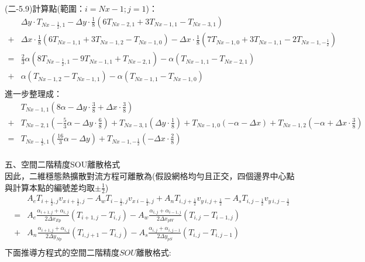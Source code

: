 \documentclass[12pt]{article}
\begin{document}
\noindent (二-5.9)計算點(範圍：$i = Nx-1 ; j = 1$)：\\
\begin{equation}
\begin{split}
  &\Delta y \cdot T_{Nx-\frac{1}{2},1}  
  - \Delta y \cdot \frac{1}{8}\left(6T_{Nx-2,1}+3T_{Nx-1,1}-T_{Nx-3,1}\right) \\
  + &\Delta x \cdot \frac{1}{8}\left(6T_{Nx-1,1}+3T_{Nx-1,2}-T_{Nx-1,0}\right)  
  - \Delta x \cdot \frac{1}{8}\left(7T_{Nx-1,0}+3T_{Nx-1,1}-2T_{Nx-1,-\frac{1}{2}}\right) \\
  = & \frac{2}{3}\alpha (8T_{Nx-\frac{1}{2},1}-9T_{Nx-1,1}+T_{Nx-2,1})-  \alpha (T_{Nx-1,1}-T_{Nx-2,1})\\
  + & \alpha (T_{Nx-1,2}-T_{Nx-1,1}) -  \alpha (T_{Nx-1,1}-T_{Nx-1,0}) \\
\end{split}
\end{equation}
\noindent 進一步整理成：
\begin{equation}
\begin{split}
  &T_{Nx-1,1}(8\alpha - \Delta y \cdot \frac{3}{8}+ \Delta x \cdot \frac{3}{8}) \\
  +& T_{Nx-2,1}(-\frac{5}{3}\alpha- \Delta y \cdot \frac{6}{8})+T_{Nx-3,1}(\Delta y \cdot \frac{1}{8})+T_{Nx-1,0}(-\alpha- \Delta x )+T_{Nx-1,2}(-\alpha+\Delta x \cdot \frac{3}{8})\\
  =&T_{Nx-\frac{1}{2},1}(\frac{16}{3}\alpha-\Delta y )+T_{Nx-1,-\frac{1}{2}}(- \Delta x \cdot \frac{2}{8})\\
\end{split}
\end{equation}
\newpage

\noindent 五、空間二階精度SOU離散格式 \\

因此，二維穩態熱擴散對流方程可離散為(假設網格均勻且正交，四個邊界中心點與計算本點的編號差均取$\pm \frac{1}{2}$)\\
\begin{equation}
  \begin{split}
    &A_{e}T_{i+\frac{1}{2},j}v_{x\ i+\frac{1}{2},j} - A_{w}T_{i-\frac{1}{2},j}v_{x\ i-\frac{1}{2},j} + A_{n}T_{i,j+\frac{1}{2}}v_{y\ i,j+\frac{1}{2}} - A_{s}T_{i,j-\frac{1}{2}}v_{y\ i,j-\frac{1}{2}} \\
     = & A_{e}\frac{\alpha_{i+1,j}+\alpha_{i,j}}{2\Delta x_{Ep}}(T_{i+1,j}-T_{i,j}) - A_{w}\frac{\alpha_{i,j}+\alpha_{i-1,j}}{2\Delta x_{pW}}(T_{i,j} - T_{i-1,j}) \\
     + & A_{n}\frac{\alpha_{i+1,j}+\alpha_{i,j}}{2\Delta y_{Np}}(T_{i,j+1}-T_{i,j}) - A_{s}\frac{\alpha_{i,j}+\alpha_{i,j-1}}{2\Delta y_{pS}}(T_{i,j}-T_{i,j-1})\\
  \end{split}
\end{equation}
\noindent 下面推導方程式的空間二階精度$SOU$離散格式:\\
\end{document}
